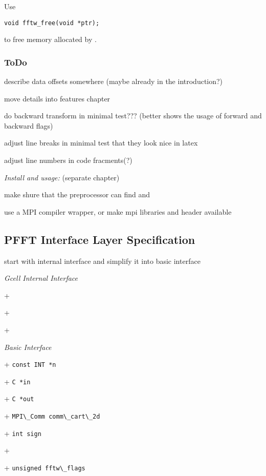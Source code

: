 Use
\begin{lstlisting}
void fftw_free(void *ptr);
\end{lstlisting}
to free memory allocated by .

\subsubsection*{ToDo}
\begin{compactitem}
  \item describe data offsets somewhere (maybe already in the introduction?)
  \item move details into features chapter
  \item do backward transform in minimal test??? (better shows the usage of forward and backward flags)
  \item adjust line breaks in minimal test that they look nice in latex
  \item adjust line numbers in code fracments(?)
\end{compactitem}

\emph{Install and usage:} (separate chapter)
\begin{compactitem}
  \item 
  \item[\mybox] make shure that the preprocessor can find  and 
  \item[\mybox] use a MPI compiler wrapper, or make mpi libraries and header available
\end{compactitem}





\newpage
\subsection{PFFT Interface Layer Specification}
\begin{compactitem}
  \myitem start with internal interface and simplify it into basic interface
\end{compactitem}


\emph{Gcell Internal Interface}
\begin{compactitem}
  \item[+] \verb++
  \item[+] \verb++
  \item[+] \verb++
\end{compactitem}




\emph{Basic Interface}
\begin{compactitem}
  \item[+] \verb+const INT *n+
  \item[+] \verb+C *in+
  \item[+] \verb+C *out+
  \item[+] \verb+MPI\_Comm comm\_cart\_2d+
  \item[+] \verb+int sign+
  \item[+] 
  \item[+] \verb+unsigned fftw\_flags+
\end{compactitem}


